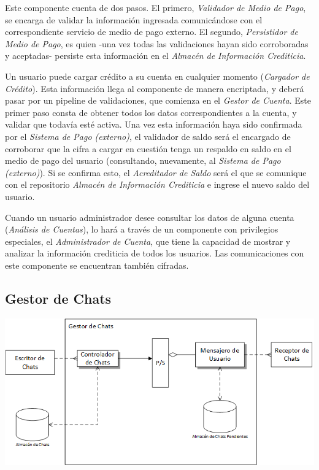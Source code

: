 Este componente cuenta de dos pasos. El primero, \emph{Validador de Medio de Pago}, se encarga de validar la información ingresada comunicándose con el correspondiente servicio de medio de pago externo. El segundo, \emph{Persistidor de Medio de Pago}, es quien -una vez todas las validaciones hayan sido corroboradas y aceptadas- persiste esta información en el \emph{Almacén de Información Crediticia}.

Un usuario puede cargar crédito a su cuenta en cualquier momento (\emph{Cargador de Crédito}). Esta información llega al componente de manera encriptada, y deberá pasar por un pipeline de validaciones, que comienza en el \emph{Gestor de Cuenta}. Este primer paso consta de obtener todos los datos correspondientes a la cuenta, y validar que todavía esté activa. Una vez esta información haya sido confirmada por el \emph{Sistema de Pago (externo)}, el validador de saldo será el encargado de corroborar que la cifra a cargar en cuestión tenga un respaldo en saldo en el medio de pago del usuario (consultando, nuevamente, al \emph{Sistema de Pago (externo)}). Si se confirma esto, el \emph{Acreditador de Saldo} será el que se comunique con el repositorio \emph{Almacén de Información Crediticia} e ingrese el nuevo saldo del usuario.

Cuando un usuario administrador desee consultar los datos de alguna cuenta (\emph{Análisis de Cuentas}), lo hará a través de un componente con privilegios especiales, el \emph{Administrador de Cuenta}, que tiene la capacidad de mostrar y analizar la información crediticia de todos los usuarios. Las comunicaciones con este componente se encuentran también cifradas.

\newpage
\subsection{Gestor de Chats}
\begin{center}
\includegraphics[scale=0.80]{diagramas/gestor_de_chats}
\label{fig:gestor_de_chats}
\end{center}


